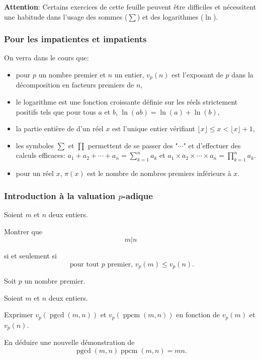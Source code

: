 

    \textbf{Attention}: Certains exercices de cette feuille peuvent être difficiles et nécessitent une habitude dans l'usage des sommes ($\sum$) et des logarithmes ($\ln$).



\subsubsection{Pour les impatientes et impatients}

On verra dans le cours que:

\begin{itemize}
    \item pour $p$ un nombre premier et $n$ un entier, $v_p(n)$ est l'exposant de $p$ dans la décomposition en facteurs premiers de $n$,
    \item le logarithme est une fonction croissante définie sur les réels strictement positifs tels que pour tous $a$ et $b$, $\ln(ab) = \ln(a) + \ln(b)$,
    \item la partie entière de d'un réel $x$ est l'unique entier vérifiant $\lfloor x \rfloor \leq x < \lfloor x \rfloor +1$,
    \item les symboles $\sum$ et $\prod$ permettent de se passer des "$\cdots$" et d'effectuer des calculs efficaces: $a_1 + a_2 + \cdots + a_n = \sum_{k=1}^n a_k$ et $a_1 \times a_2 \times \cdots \times a_n = \prod_{k=1}^n a_k$.
    \item pour un réel $x$, $\pi(x)$ est le nombre de nombres premiers inférieurs à $x$.
\end{itemize}


\subsubsection{Introduction à la valuation $p$-adique}

\begin{exo}
    Soient $m$ et $n$ deux entiers.

    Montrer que
    \[m | n\]

    si et seulement si
    \[\text{ pour tout } p \text{ premier, } v_p(m) \leq v_p(n).\]
\end{exo}

\begin{exo}
    Soit $p$ un nombre premier.

    Soient $m$ et $n$ deux entiers.

    Exprimer $v_p(\operatorname{pgcd}(m,n))$ et $v_p(\operatorname{ppcm}(m,n))$ en fonction de $v_p(m)$ et $v_p(n)$.

    En déduire une nouvelle démonstration de
    \[\operatorname{pgcd}(m,n) \operatorname{ppcm}(m,n) = m n.\]
\end{exo}



